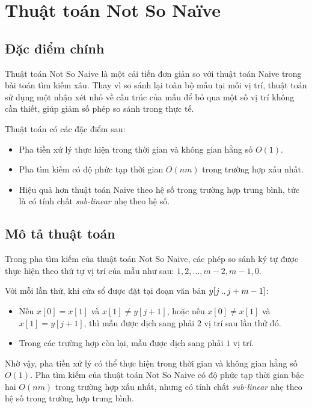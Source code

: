 \section{Thuật toán Not So Naïve}
\subsection{Đặc điểm chính}
Thuật toán Not So Naive là một cải tiến đơn giản so với thuật toán Naive
trong bài toán tìm kiếm xâu. Thay vì so sánh lại toàn bộ mẫu tại mỗi vị
trí, thuật toán sử dụng một nhận xét nhỏ về cấu trúc của mẫu để bỏ qua
một số vị trí không cần thiết, giúp giảm số phép so sánh trong thực tế.

Thuật toán có các đặc điểm sau:

\begin{itemize}
  \item Pha tiền xử lý thực hiện trong thời gian và không gian hằng số $O(1)$.
  \item Pha tìm kiếm có độ phức tạp thời gian $O(nm)$ trong trường hợp xấu nhất.
  \item Hiệu quả hơn thuật toán Naive theo hệ số trong trường hợp trung bình,
        tức là có tính chất \textit{sub-linear} nhẹ theo hệ số.
\end{itemize}

\subsection{Mô tả thuật toán}

Trong pha tìm kiếm của thuật toán Not So Naive, các phép so sánh ký tự
được thực hiện theo thứ tự vị trí của mẫu như sau:
$1, 2, \ldots, m-2, m-1, 0$.

Với mỗi lần thử, khi cửa sổ được đặt tại đoạn văn bản $y[j \mathinner{..} j+m-1]$:
\begin{itemize}
  \item Nếu $x[0] = x[1]$ và $x[1] \neq y[j+1]$, hoặc nếu $x[0] \neq x[1]$
        và $x[1] = y[j+1]$, thì mẫu được dịch sang phải $2$ vị trí sau lần
        thử đó.
  \item Trong các trường hợp còn lại, mẫu được dịch sang phải $1$ vị trí.
\end{itemize}

Nhờ vậy, pha tiền xử lý có thể thực hiện trong thời gian và không gian
hằng số $O(1)$. Pha tìm kiếm của thuật toán Not So Naive có độ phức tạp
thời gian bậc hai $O(nm)$ trong trường hợp xấu nhất, nhưng có tính chất
\textit{sub-linear} nhẹ theo hệ số trong trường hợp trung bình.

